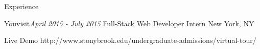 \documentclass{resume} %
\begin{document}
\begin{rSection}{Experience}
\begin{rSubsection}{Youvisit}{\em April 2015 - July 2015 }{Full-Stack Web Developer Intern}{ New York, NY}
\item Live Demo http://www.stonybrook.edu/undergraduate-admissions/virtual-tour/
\end{rSubsection}






\end{rSection}






\end{document}
